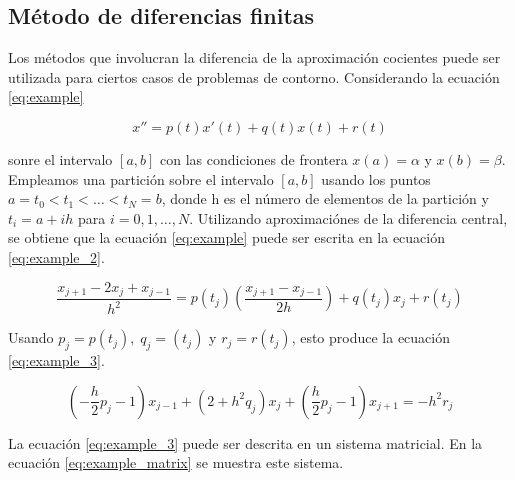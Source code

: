 \subsection{Método de diferencias finitas}

Los métodos que involucran la diferencia de la aproximación cocientes puede ser utilizada para ciertos casos de problemas de contorno. Considerando la ecuación \ref{eq:example}

\begin{equation}
    x'' = p(t)x'(t)+q(t)x(t)+r(t) \label{eq:example}
\end{equation}

sonre el intervalo $[a,b]$ con las condiciones de frontera $x(a)=\alpha$ y $x(b)=\beta$. Empleamos una partición sobre el intervalo $[a,b]$ usando los puntos $a=t_0 < t_1 < \dots < t_N=b$, donde h es el número de elementos de la partición y $t_i = a+ih$ para $i=0,1,\dots ,N$. Utilizando aproximaciónes de la diferencia central, se obtiene que la ecuación \ref{eq:example} puede ser escrita en la ecuación \ref{eq:example_2}.

\begin{equation}
    \frac{x_{j+1}-2x_j +x_{j-1}}{h^2} = p(t_j) \left (\frac{x_{j+1}-x_{j-1}}{2h}\right ) + q(t_j)x_j + r(t_j) \label{eq:example_2}
\end{equation}

Usando $p_j=p(t_j),\; q_j=(t_j)$ y $r_j=r(t_j)$, esto produce la ecuación \ref{eq:example_3}.

\begin{equation}
    \left (-\frac{h}{2}p_j -1\right ) x_{j-1} + (2+h^2q_j)x_j + \left (\frac{h}{2}p_j-1\right ) x_{j+1} = -h^2r_j \label{eq:example_3}
\end{equation}

La ecuación \ref{eq:example_3} puede ser descrita en un sistema matricial. En la ecuación \ref{eq:example_matrix} se muestra este sistema.

